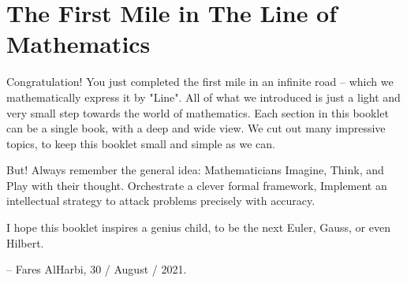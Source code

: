 
\section{The First Mile in The Line of Mathematics}
Congratulation! You just completed the first mile in an infinite road -- which we mathematically express it by "Line".
All of what we introduced is just a light and very small step towards the world of mathematics. 
Each section in this booklet can be a single book, with a deep and wide view. We cut out many impressive topics, to keep this booklet small and simple as we can.

But! Always remember the general idea: Mathematicians Imagine, Think, and Play with their thought. Orchestrate a clever formal framework, Implement an intellectual strategy to attack problems precisely with accuracy. 

\vspace{30pt}
I hope this booklet inspires a genius child, to be the next Euler, Gauss, or even Hilbert.

\vspace{10pt}
-- Fares AlHarbi, 30 / August / 2021.